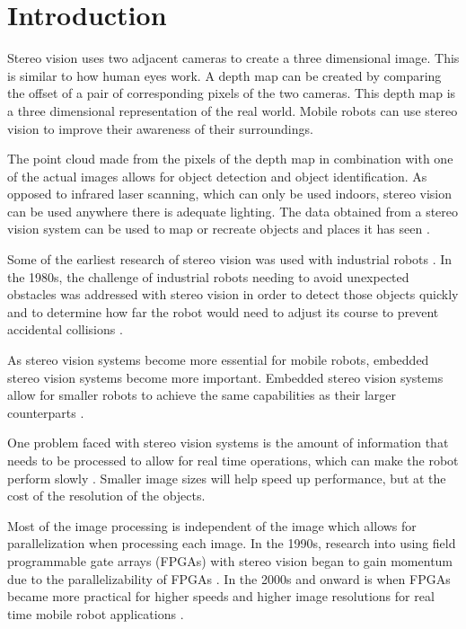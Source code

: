 \chapter{Introduction}
\label{sec:intro}

Stereo vision uses two adjacent cameras to create a three dimensional image. This is similar to how human eyes work. A depth map can be created by comparing the offset of a pair of corresponding pixels of the two cameras. This depth map is a three dimensional representation of the real world. Mobile robots can use stereo vision to improve their awareness of their surroundings.

The point cloud made from the pixels of the depth map in combination with one of the actual images allows for object detection and object identification. As opposed to infrared laser scanning, which can only be used indoors, stereo vision can be used anywhere there is adequate lighting. The data obtained from a stereo vision system can be used to map or recreate objects and places it has seen \cite{actStereoMap}.

Some of the earliest research of stereo vision was used with industrial robots \cite{industRobot}. In the 1980s, the challenge of industrial robots needing to avoid unexpected obstacles was addressed with stereo vision in order to detect those objects quickly and to determine how far the robot would need to adjust its course to prevent accidental collisions \cite{3DVision}.

As stereo vision systems become more essential for mobile robots, embedded stereo vision systems become more important. Embedded stereo vision systems allow for smaller robots to achieve the same capabilities as their larger counterparts \cite{xilinxSpartan3ABoard}.

One problem faced with stereo vision systems is the amount of information that needs to be processed to allow for real time operations, which can make the robot perform slowly \cite{nav}. Smaller image sizes will help speed up performance, but at the cost of the resolution of the objects. 

Most of the image processing is independent of the image which allows for parallelization when processing each image. In the 1990s, research into using field programmable gate arrays (FPGAs) with stereo vision began to gain momentum due to the parallelizability of FPGAs \cite{stereoFPGA}. In the 2000s and onward is when FPGAs became more practical for higher speeds and higher image resolutions for real time mobile robot applications \cite{fpga}.

